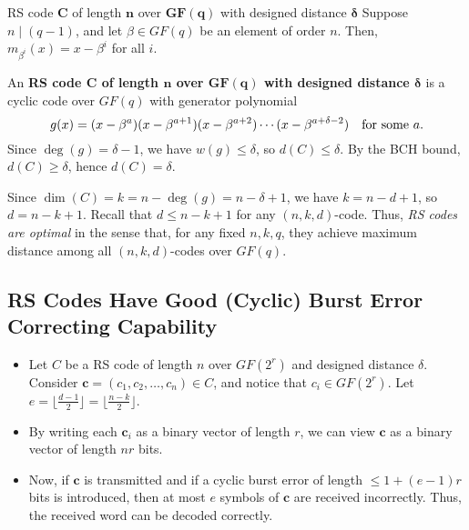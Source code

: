 \begin{Definition}{RS code $ \symbf{C} $ of length $ \symbf{n} $ over $ \symbf{GF(q)} $
        with designed distance $ \symbf{\delta} $}{}
    Suppose $ n\mid (q-1) $, and let $ \beta\in GF(q) $ be an element of order $ n $.
    Then, $ m_{\beta^i}(x)=x-\beta^i $ for all $ i $.

    \vspace{1mm}

    An
    \textbf{RS code $ \symbf{C} $ of length $ \symbf{n} $ over $ \symbf{GF(q)} $
        with designed distance $ \symbf{\delta} $} is a cyclic code over $ GF(q) $
    with generator polynomial
    \[ g(x)=(x-\beta^{a})(x-\beta^{a+1})(x-\beta^{a+2})\cdots
        (x-\beta^{a+\delta-2})\quad\text{for some $ a $.} \]
    Since $ \deg(g)=\delta-1 $, we have $ w(g)\leqslant \delta $,
    so $ d(C)\leqslant \delta $.
    By the BCH bound, $ d(C)\geqslant \delta $, hence $ d(C)=\delta $.
\end{Definition}
Since $ \dim(C)=k=n-\deg(g)=n-\delta+1 $, we have $ k=n-d+1 $,
so $ d=n-k+1 $. Recall that $ d\leqslant n-k+1 $ for any $ (n,k,d) $-code.
Thus, \emph{RS codes are optimal} in the sense that, for any fixed $ n,k,q $,
they achieve maximum distance among all $ (n,k,d) $-codes over $ GF(q) $.

\subsection*{RS Codes Have Good (Cyclic) Burst Error Correcting Capability}
\begin{itemize}
    \item Let $ C $ be a RS code of length $ n $ over $ GF(2^r) $ and designed
          distance $ \delta $. Consider $ \symbf{c}=(c_1,c_2,\ldots ,c_n)\in C $,
          and notice that $ c_i\in GF(2^r) $.
          Let $ e=\lfloor\frac{d-1}{2} \rfloor =\lfloor\frac{n-k}{2} \rfloor $.
    \item By writing each $ \symbf{c}_i $ as a binary vector of length
          $ r $, we can view $ \symbf{c} $ as a binary vector of length $ nr $ bits.

    \item Now, if $ \symbf{c} $ is transmitted and if a cyclic burst error of length
          $ \leqslant 1+(e-1)r $ bits is introduced, then at most $ e $
          symbols of $ \symbf{c} $ are received incorrectly. Thus, the received
          word can be decoded correctly.
\end{itemize}


